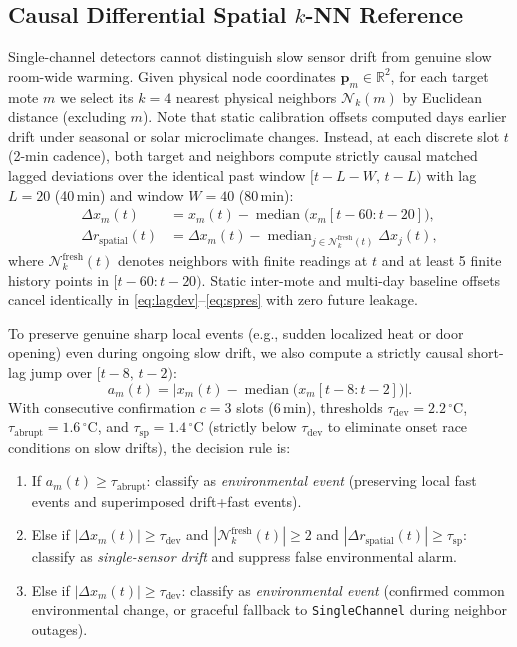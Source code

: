 \documentclass[journal,twoside,web]{ieeecolor}
\begin{document}
\subsection{Causal Differential Spatial $k$-NN Reference}
Single-channel detectors cannot distinguish slow sensor drift from genuine slow room-wide warming. Given physical node coordinates $\mathbf{p}_m \in \mathbb{R}^2$, for each target mote $m$ we select its $k{=}4$ nearest physical neighbors $\mathcal{N}_k(m)$ by Euclidean distance (excluding $m$). Note that static calibration offsets computed days earlier drift under seasonal or solar microclimate changes. Instead, at each discrete slot $t$ (2-min cadence), both target and neighbors compute strictly causal matched lagged deviations over the identical past window $[t{-}L{-}W,\, t{-}L)$ with lag $L{=}20$ (40\,min) and window $W{=}40$ (80\,min):
\begin{align}
\Delta x_m(t) &= x_m(t) - \operatorname{median}\!\big(x_m[t{-}60 : t{-}20]\big), \label{eq:lagdev} \\
\Delta r_{\text{spatial}}(t) &= \Delta x_m(t) - \operatorname{median}_{j \in \mathcal{N}_k^{\text{fresh}}(t)} \Delta x_j(t), \label{eq:spres}
\end{align}
where $\mathcal{N}_k^{\text{fresh}}(t)$ denotes neighbors with finite readings at $t$ and at least 5 finite history points in $[t{-}60:t{-}20)$. Static inter-mote and multi-day baseline offsets cancel identically in \eqref{eq:lagdev}--\eqref{eq:spres} with zero future leakage.

To preserve genuine sharp local events (e.g., sudden localized heat or door opening) even during ongoing slow drift, we also compute a strictly causal short-lag jump over $[t{-}8,\, t{-}2)$:
\begin{equation}
a_m(t) = \big|x_m(t) - \operatorname{median}\!\big(x_m[t{-}8 : t{-}2]\big)\big|.
\label{eq:abrupt}
\end{equation}
With consecutive confirmation $c{=}3$ slots (6\,min), thresholds $\tau_{\text{dev}}{=}2.2\,^{\circ}\text{C}$, $\tau_{\text{abrupt}}{=}1.6\,^{\circ}\text{C}$, and $\tau_{\text{sp}}{=}1.4\,^{\circ}\text{C}$ (strictly below $\tau_{\text{dev}}$ to eliminate onset race conditions on slow drifts), the decision rule is:
\begin{enumerate}
\item If $a_m(t) \ge \tau_{\text{abrupt}}$: classify as \textit{environmental event} (preserving local fast events and superimposed drift+fast events).
\item Else if $|\Delta x_m(t)| \ge \tau_{\text{dev}}$ and $|\mathcal{N}_k^{\text{fresh}}(t)| \ge 2$ and $|\Delta r_{\text{spatial}}(t)| \ge \tau_{\text{sp}}$: classify as \textit{single-sensor drift} and suppress false environmental alarm.
\item Else if $|\Delta x_m(t)| \ge \tau_{\text{dev}}$: classify as \textit{environmental event} (confirmed common environmental change, or graceful fallback to \texttt{SingleChannel} during neighbor outages).
\end{enumerate}
\end{document}
